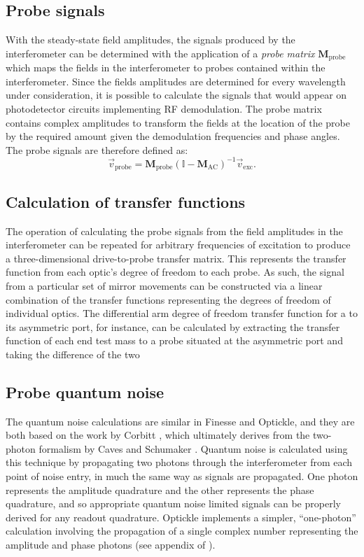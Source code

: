 \subsection{Probe signals}
With the steady-state field amplitudes, the signals produced by the interferometer can be determined with the application of a \emph{probe matrix} $\mathbf{M}_{\text{probe}}$ which maps the fields in the interferometer to probes contained within the interferometer. Since the fields amplitudes are determined for every wavelength under consideration, it is possible to calculate the signals that would appear on photodetector circuits implementing \gls{RF} demodulation. The probe matrix contains complex amplitudes to transform the fields at the location of the probe by the required amount given the demodulation frequencies and phase angles. The probe signals are therefore defined as:
\begin{equation}
  \vec{v}_{\text{probe}} = \mathbf{M}_{\text{probe}} \left( \mathbb{I} - \mathbf{M}_{\text{AC}} \right)^{-1} \vec{v}_{\text{exc}}.
\end{equation}

\subsection{Calculation of transfer functions}
The operation of calculating the probe signals from the field amplitudes in the interferometer can be repeated for arbitrary frequencies of excitation to produce a three-dimensional drive-to-probe transfer matrix. This represents the transfer function from each optic's degree of freedom to each probe. As such, the signal from a particular set of mirror movements can be constructed via a linear combination of the transfer functions representing the degrees of freedom of individual optics. The differential arm degree of freedom transfer function for a \MI{} to its asymmetric port, for instance, can be calculated by extracting the transfer function of each end test mass to a probe situated at the asymmetric port and taking the difference of the two 

\subsection{Probe quantum noise}
The quantum noise calculations are similar in Finesse and Optickle, and they are both based on the work by Corbitt \etal{} \cite{Corbitt2005}, which ultimately derives from the two-photon formalism by Caves and Schumaker \cite{Caves1985, Schumaker1985}. Quantum noise is calculated using this technique by propagating two photons through the interferometer from each point of noise entry, in much the same way as signals are propagated. One photon represents the amplitude quadrature and the other represents the phase quadrature, and so appropriate quantum noise limited signals can be properly derived for any readout quadrature. Optickle implements a simpler, ``one-photon'' calculation involving the propagation of a single complex number representing the amplitude and phase photons (see appendix of \cite{Evans2013}). 

